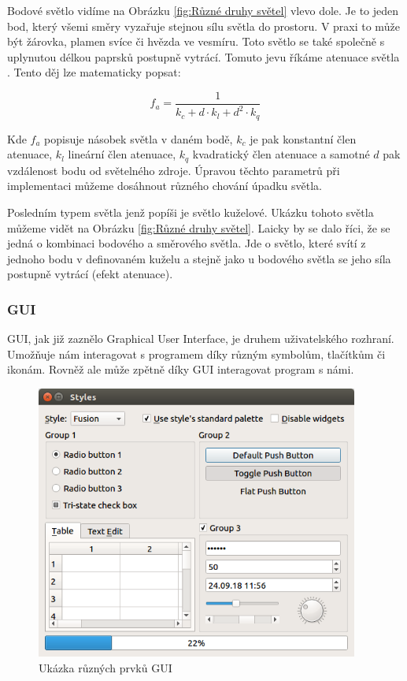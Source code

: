 \documentclass[12pt]{article}
\begin{document}
Bodové světlo vidíme na Obrázku \ref{fig:Různé druhy světel} vlevo dole. Je to jeden bod, který všemi směry vyzařuje stejnou sílu světla do prostoru. V praxi to může být žárovka, plamen svíce či hvězda ve vesmíru. Toto světlo se také společně s uplynutou délkou paprsků postupně vytrácí. Tomuto jevu říkáme atenuace světla \cite{attenuation}. Tento děj lze matematicky popsat:

\[f_a = \frac{1}{k_c + d \cdot k_l + d^2 \cdot k_q}\]

Kde $f_a$ popisuje násobek světla v daném bodě, $k_c$ je pak konstantní člen atenuace, $k_l$ lineární člen atenuace, $k_q$ kvadratický člen atenuace a samotné $d$ pak vzdálenost bodu od světelného zdroje. Úpravou těchto parametrů při implementaci můžeme dosáhnout různého chování úpadku světla.

Posledním typem světla jenž popíši je světlo kuželové. Ukázku tohoto světla můžeme vidět na Obrázku \ref{fig:Různé druhy světel}. Laicky by se dalo říci, že se jedná o kombinaci bodového a směrového světla. Jde  o světlo, které svítí z jednoho bodu v definovaném kuželu a stejně jako u bodového světla se jeho síla postupně vytrácí (efekt atenuace). \cite{spotlight}

\subsubsection{GUI}

GUI, jak již zaznělo Graphical User Interface, je druhem uživatelského rozhraní. Umožňuje nám interagovat s programem díky různým symbolům, tlačítkům či ikonám. Rovněž ale může zpětně díky GUI interagovat program s námi. \cite{gui2}

\vspace{0.5cm}
\begin{figure}[h]
    \centering
    \includegraphics[height=9cm]{gui.png}
    \caption[Ukázka různých prvků GUI]{Ukázka různých prvků GUI \cite{gui_img}}
    \label{fig:Ukázka různých prvků GUI}
\end{figure}
\end{document}
